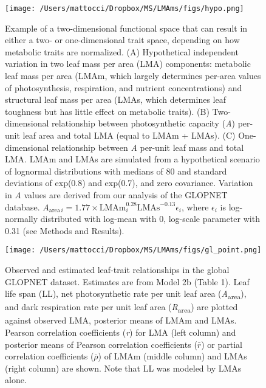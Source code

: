 \documentclass[
  12pt,
  a4paper,
,tablecaptionabove
]{scrartcl}
\begin{document}
\newpage

\begin{figure}

{\centering \texttt{[image: /Users/mattocci/Dropbox/MS/LMAms/figs/hypo.png]}

}

\caption{\label{fig-Hplt}Example of a two-dimensional functional space
that can result in either a two- or one-dimensional trait space,
depending on how metabolic traits are normalized. (A) Hypothetical
independent variation in two leaf mass per area (LMA) components:
metabolic leaf mass per area (LMAm, which largely determines per-area
values of photosynthesis, respiration, and nutrient concentrations) and
structural leaf mass per area (LMAs, which determines leaf toughness but
has little effect on metabolic traits). (B) Two-dimensional relationship
between photosynthetic capacity (\emph{A}) per-unit leaf area and total
LMA (equal to LMAm + LMAs). (C) One-dimensional relationship between
\emph{A} per-unit leaf mass and total LMA. LMAm and LMAs are simulated
from a hypothetical scenario of lognormal distributions with medians of
80 and standard deviations of exp(0.8) and exp(0.7), and zero
covariance. Variation in \emph{A} values are derived from our analysis
of the GLOPNET database.
\(A_{\mathrm{area} \, i}=1.77 \times \mathrm{LMAm}_i^{0.28}\mathrm{LMAs}^{-0.13}\epsilon_i\),
where \(\epsilon_i\) is log-normally distributed with log-mean with 0,
log-scale parameter with 0.31 (see Methods and Results).}

\end{figure}

\begin{figure}

{\centering \texttt{[image: /Users/mattocci/Dropbox/MS/LMAms/figs/gl\_point.png]}

}

\caption{\label{fig-GLplt}Observed and estimated leaf-trait
relationships in the global GLOPNET dataset. Estimates are from Model 2b
(Table 1). Leaf life span (LL), net photosynthetic rate per unit leaf
area (\emph{A}\textsubscript{area}), and dark respiration rate per unit
leaf area (\emph{R}\textsubscript{area}) are plotted against observed
LMA, posterior means of LMAm and LMAs. Pearson correlation coefficients
(\emph{r}) for LMA (left column) and posterior means of Pearson
correlation coefficients (\(\bar{r}\)) or partial correlation
coefficients (\(\bar{\rho}\)) of LMAm (middle column) and LMAs (right
column) are shown. Note that LL was modeled by LMAs alone.}

\end{figure}
\end{document}
